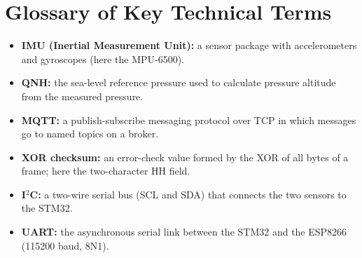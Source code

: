 \documentclass[12pt,a4paper]{report}
\begin{document}
\section{Glossary of Key Technical Terms}
\begin{itemize}
\item \textbf{IMU (Inertial Measurement Unit):} a sensor package with accelerometers and gyroscopes (here the MPU-6500).
\item \textbf{QNH:} the sea-level reference pressure used to calculate pressure altitude from the measured pressure.
\item \textbf{MQTT:} a publish-subscribe messaging protocol over TCP in which messages go to named topics on a broker.
\item \textbf{XOR checksum:} an error-check value formed by the XOR of all bytes of a frame; here the two-character HH field.
\item \textbf{I$^2$C:} a two-wire serial bus (SCL and SDA) that connects the two sensors to the STM32.
\item \textbf{UART:} the asynchronous serial link between the STM32 and the ESP8266 (115200 baud, 8N1).
\end{itemize}
\end{document}
